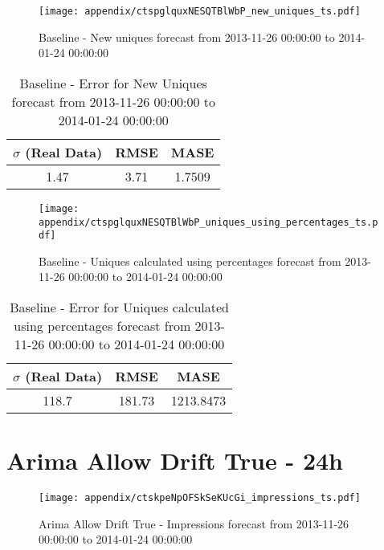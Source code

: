 \begin{figure}[H] \begin{center} \leavevmode
\texttt{[image: appendix/ctspglquxNESQTBlWbP\_new\_uniques\_ts.pdf]} \caption{
Baseline - New uniques forecast from 2013-11-26 00:00:00 to 2014-01-24 00:00:00} \label{fig:appendix/ctspglquxNESQTBlWbP_new_uniques_ts.pdf} \end{center}
\end{figure}

\begin{table}[H]
\centering
\footnotesize
\begin{tabular}{ccc}
$\sigma$ (Real Data) & RMSE & MASE   \\ \hline
1.47 & 3.71 & 1.7509 \\
\end{tabular}

\vspace{0.5cm}

\caption{
Baseline - Error for New Uniques forecast from 2013-11-26 00:00:00 to 2014-01-24 00:00:00}
\end{table}

\begin{figure}[H] \begin{center} \leavevmode
\texttt{[image: appendix/ctspglquxNESQTBlWbP\_uniques\_using\_percentages\_ts.pdf]} \caption{
Baseline - Uniques calculated using percentages forecast from 2013-11-26 00:00:00 to 2014-01-24 00:00:00} \label{fig:appendix/ctspglquxNESQTBlWbP_uniques_using_percentages_ts.pdf} \end{center}
\end{figure}

\begin{table}[H]
\centering
\footnotesize
\begin{tabular}{ccc}
$\sigma$ (Real Data) & RMSE & MASE   \\ \hline
118.7 & 181.73 & 1213.8473 \\
\end{tabular}

\vspace{0.5cm}

\caption{
Baseline - Error for Uniques calculated using percentages forecast from 2013-11-26 00:00:00 to 2014-01-24 00:00:00}
\end{table}

\section{Arima Allow Drift True - 24h}
\begin{figure}[H] \begin{center} \leavevmode
\texttt{[image: appendix/ctskpeNpOFSkSeKUcGi\_impressions\_ts.pdf]} \caption{
Arima Allow Drift True - Impressions forecast from 2013-11-26 00:00:00 to 2014-01-24 00:00:00} \label{fig:appendix/ctskpeNpOFSkSeKUcGi_impressions_ts.pdf} \end{center}
\end{figure}


